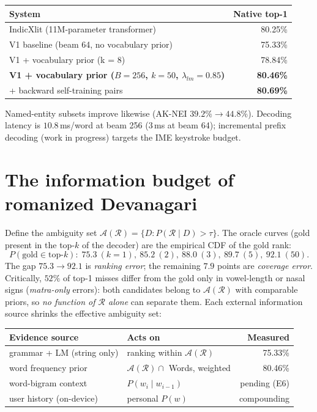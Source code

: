 \documentclass[11pt,a4paper]{article}
\newcommand{\A}{\mathcal{A}}
\newcommand{\R}{\mathcal{R}}
\begin{document}
\begin{center}
\begin{tabular}{lr}
\hline
System & Native top-1 \\
\hline
IndicXlit (11M-parameter transformer) \citep{indicxlit} & 80.25\% \\
V1 baseline (beam 64, no vocabulary prior) & 75.33\% \\
V1 + vocabulary prior (k = 8) & 78.84\% \\
\textbf{V1 + vocabulary prior ($B{=}256$, $k{=}50$, $\lambda_{lm}{=}0.85$)} & \textbf{80.46\%} \\
\quad + backward self-training pairs & \textbf{80.69\%} \\
\hline
\end{tabular}
\end{center}

Named-entity subsets improve likewise (AK-NEI $39.2\% \to 44.8\%$).
Decoding latency is $10.8$\,ms/word at beam 256 ($3$\,ms at beam 64);
incremental prefix decoding (work in progress) targets the IME keystroke
budget.

\section{The information budget of romanized Devanagari}

Define the ambiguity set $\A(\R) = \{D : P(\R \mid D) > \tau\}$. The oracle
curves (gold present in the top-$k$ of the decoder) are the empirical CDF
of the gold rank:
\[
P(\text{gold} \in \text{top-}k):\; 75.3\ (k{=}1),\ 85.2\ (2),\ 88.0\ (3),\ 89.7\ (5),\ 92.1\ (50).
\]
The gap $75.3 \to 92.1$ is \emph{ranking error}; the remaining $7.9$ points
are \emph{coverage error}. Critically, $52\%$ of top-1 misses differ from
the gold only in vowel-length or nasal signs (\emph{matra-only} errors):
both candidates belong to $\A(\R)$ with comparable priors, so
\emph{no function of $\R$ alone} can separate them. Each external
information source shrinks the effective ambiguity set:

\begin{center}
\begin{tabular}{llr}
\hline
Evidence source & Acts on & Measured \\
\hline
grammar + LM (string only) & ranking within $\A(\R)$ & 75.33\% \\
word frequency prior & $\A(\R) \cap$ Words, weighted & 80.46\% \\
word-bigram context & $P(w_i \mid w_{i-1})$ & pending (E6) \\
user history (on-device) & personal $P(w)$ & compounding \\
\hline
\end{tabular}
\end{center}
\end{document}
